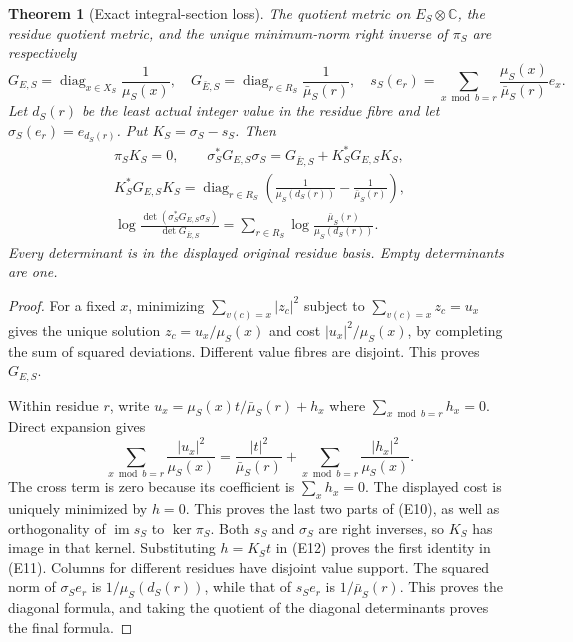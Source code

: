 \documentclass[11pt]{article}
\newtheorem{theorem}{Theorem}
\newcommand{\C}{\mathbb C}
\begin{document}
\begin{theorem}[Exact integral-section loss]
The quotient metric on \(E_S\otimes\C\), the residue quotient metric,
and the unique minimum-norm right inverse of \(\pi_S\) are respectively
\[
 G_{E,S}=\operatorname{diag}_{x\in X_S}\frac1{\mu_S(x)},\quad
 G_{\bar E,S}=\operatorname{diag}_{r\in R_S}\frac1{\bar\mu_S(r)},\quad
 s_S(e_r)=\sum_{x\bmod b=r}\frac{\mu_S(x)}{\bar\mu_S(r)}e_x .
 \tag{E10}
\]
Let \(d_S(r)\) be the least actual integer value in the residue fibre
and let \(\sigma_S(e_r)=e_{d_S(r)}\).  Put \(K_S=\sigma_S-s_S\).
Then
\[
 \begin{gathered}
 \pi_SK_S=0,\qquad
 \sigma_S^*G_{E,S}\sigma_S
   =G_{\bar E,S}+K_S^*G_{E,S}K_S,\\
 K_S^*G_{E,S}K_S
   =\operatorname{diag}_{r\in R_S}
       \left(\frac1{\mu_S(d_S(r))}-\frac1{\bar\mu_S(r)}\right),\\
 \log\frac{\det(\sigma_S^*G_{E,S}\sigma_S)}{\det G_{\bar E,S}}
   =\sum_{r\in R_S}\log\frac{\bar\mu_S(r)}{\mu_S(d_S(r))}.
 \end{gathered}
 \tag{E11}
\]
Every determinant is in the displayed original residue basis.  Empty
determinants are one.
\end{theorem}
\begin{proof}
For a fixed \(x\), minimizing \(\sum_{v(c)=x}|z_c|^2\) subject to
\(\sum_{v(c)=x}z_c=u_x\) gives the unique solution
\(z_c=u_x/\mu_S(x)\) and cost \(|u_x|^2/\mu_S(x)\), by completing
the sum of squared deviations.  Different value fibres are disjoint.
This proves \(G_{E,S}\).

Within residue \(r\), write \(u_x=\mu_S(x)t/\bar\mu_S(r)+h_x\)
where \(\sum_{x\bmod b=r}h_x=0\).  Direct expansion gives
\[
 \sum_{x\bmod b=r}\frac{|u_x|^2}{\mu_S(x)}
 =\frac{|t|^2}{\bar\mu_S(r)}
  +\sum_{x\bmod b=r}\frac{|h_x|^2}{\mu_S(x)} .
 \tag{E12}
\]
The cross term is zero because its coefficient is
\(\sum_xh_x=0\).  The displayed cost is uniquely minimized by \(h=0\).
This proves the last two parts of (E10), as well as orthogonality of
\(\operatorname{im}s_S\) to \(\ker\pi_S\).  Both \(s_S\) and
\(\sigma_S\) are right inverses, so \(K_S\) has image in that kernel.
Substituting \(h=K_St\) in (E12) proves the first identity in (E11).
Columns for different residues have disjoint value support.
The squared norm of \(\sigma_Se_r\) is
\(1/\mu_S(d_S(r))\), while that of \(s_Se_r\) is
\(1/\bar\mu_S(r)\).  This proves the diagonal formula, and taking
the quotient of the diagonal determinants proves the final formula.
\end{proof}
\end{document}
